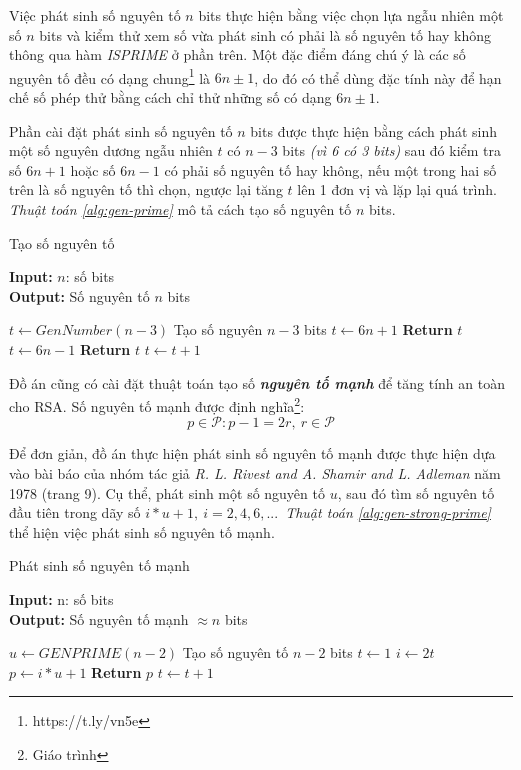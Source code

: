 Việc phát sinh số nguyên tố $n$ bits thực hiện bằng việc chọn lựa ngẫu nhiên một số $n$ bits và kiểm thử xem số vừa phát sinh có phải là số nguyên tố hay không 
thông qua hàm \textit{ISPRIME} ở phần trên. Một đặc điểm đáng chú ý là các số nguyên tố đều có dạng chung\footnote{https://t.ly/vn5e} là  $6n \pm 1$, do đó có thể dùng đặc tính này để hạn chế số phép 
thử bằng cách chỉ thử những số có dạng $6n \pm 1$.

Phần cài đặt phát sinh số nguyên tố $n$ bits được thực hiện bằng cách phát sinh một số nguyên dương ngẫu nhiên $t$ có $n-3$ bits \textit{(vì 6 có 3 bits)} sau đó kiểm tra số 
$6n + 1$ hoặc số $6n - 1$ có phải số nguyên tố hay không, nếu một trong hai số trên là số nguyên tố thì chọn, ngược lại tăng $t$ lên 1 đơn vị và lặp lại quá trình. 
\textit{Thuật toán \ref{alg:gen-prime}} mô tả cách tạo số nguyên tố $n$ bits.

\begin{algorithm} [H]
\caption{Tạo số nguyên tố}\label{alg:gen-prime}
\hspace*{\algorithmicindent} \textbf{Input:} $n$: số bits\\
\hspace*{\algorithmicindent} \textbf{Output:} Số nguyên tố $n$ bits 
\begin{algorithmic}[1]
\State $t \gets GenNumber(n-3)$ \Comment Tạo số nguyên $n-3$ bits
\State $t \gets 6n + 1$
\State \textbf{Return } $t$
\EndIf
\State $t \gets 6n - 1$
\State \textbf{Return } $t$
\EndIf
\State $t \gets t + 1$
\EndWhile
\EndProcedure
\end{algorithmic}
\end{algorithm}

Đồ án cũng có cài đặt thuật toán tạo số \textbf{\textit{nguyên tố mạnh}} để tăng tính an toàn cho RSA. Số nguyên tố mạnh được định nghĩa\footnote{Giáo trình}:
\[ p \in \mathcal{P}: p - 1 = 2r,\ r \in \mathcal{P} \]

Để đơn giản, đồ án thực hiện phát sinh số nguyên tố mạnh được thực hiện dựa vào bài báo \cite{Rivest1978} của nhóm tác giả \textit{R. L. Rivest and 
A. Shamir and L. Adleman} năm 1978 (trang 9). Cụ thể, phát sinh một số nguyên tố $u$, sau đó tìm số nguyên tố đầu tiên trong dãy số $i*u + 1,\ i=2,4,6,...$\ \textit{Thuật toán \ref{alg:gen-strong-prime}} 
thể hiện việc phát sinh số nguyên tố mạnh.

\begin{algorithm} [H]
\caption{Phát sinh số nguyên tố mạnh}\label{alg:gen-strong-prime}
\hspace*{\algorithmicindent} \textbf{Input:} n: số bits\\
\hspace*{\algorithmicindent} \textbf{Output:} Số nguyên tố mạnh $\approx n$ bits 
\begin{algorithmic}[1]
\State $u \gets GENPRIME(n-2)$ \Comment Tạo số nguyên tố $n-2$ bits
\State $t \gets 1$
\State $i \gets 2t$
\State $p \gets i*u + 1$
\State \textbf{Return } $p$
\EndIf
\State $t \gets t + 1$
\EndWhile
\EndProcedure
\end{algorithmic}
\end{algorithm}

